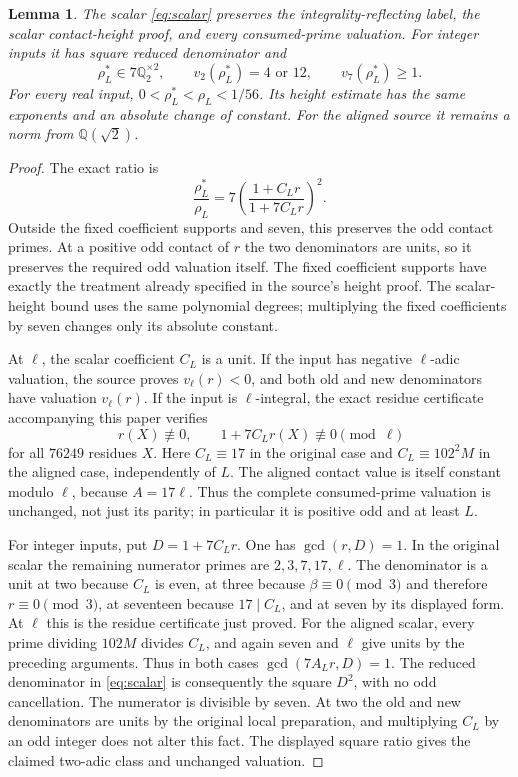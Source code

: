 \documentclass[11pt,a4paper]{article}
\newtheorem{lemma}[theorem]{Lemma}
\newcommand{\Q}{\mathbb Q}\newcommand{\Z}{\mathbb Z}
\begin{document}
\begin{lemma}\label{lem:scalar}
The scalar \eqref{eq:scalar} preserves the integrality-reflecting
label, the scalar contact-height proof, and every consumed-prime
valuation. For integer inputs it has square reduced denominator and
\[
 \rho_L^*\in7\Q_2^{\times2},\qquad
 v_2(\rho_L^*)=4\text{ or }12,\qquad v_7(\rho_L^*)\ge1.
\]
For every real input, \(0<\rho_L^*<\rho_L<1/56\).
Its height estimate has the same exponents and an absolute change
of constant. For the aligned source it remains a norm from \(\Q(\sqrt2)\).
\end{lemma}
\begin{proof}
The exact ratio is
\[
 \frac{\rho_L^*}{\rho_L}
       =7\left(\frac{1+C_Lr}{1+7C_Lr}\right)^2.
\]
Outside the fixed coefficient supports and seven, this preserves the
odd contact primes. At a positive odd contact of \(r\) the two
denominators are units, so it preserves the required odd valuation
itself. The fixed coefficient supports have exactly the treatment
already specified in the source's height proof. The scalar-height
bound uses the same polynomial degrees; multiplying the fixed
coefficients by seven changes only its absolute constant.

At \(\ell\), the scalar coefficient \(C_L\) is a unit. If the
input has negative \(\ell\)-adic valuation, the source proves
\(v_\ell(r)<0\), and both old and new denominators have valuation
\(v_\ell(r)\). If the input is \(\ell\)-integral, the exact
residue certificate accompanying this paper verifies
\[
            r(X)\not\equiv0,\qquad 1+7C_Lr(X)\not\equiv0\pmod\ell
\]
for all \(76249\) residues \(X\). Here \(C_L\equiv17\) in the
original case and \(C_L\equiv102^2M\) in the aligned case,
independently of \(L\). The aligned contact value is itself
constant modulo \(\ell\), because \(A=17\ell\).
Thus the complete consumed-prime valuation is unchanged, not just
its parity; in particular it is positive odd and at least \(L\).

For integer inputs, put \(D=1+7C_Lr\). One has \(\gcd(r,D)=1\).
In the original scalar the remaining numerator primes are
\(2,3,7,17,\ell\). The denominator is a unit at two because
\(C_L\) is even, at three because \(\beta\equiv0\pmod3\) and
therefore \(r\equiv0\pmod3\), at seventeen because \(17\mid C_L\),
and at seven by its displayed form. At \(\ell\) this is the
residue certificate just proved. For the aligned scalar, every
prime dividing \(102M\) divides \(C_L\), and again seven and
\(\ell\) give units by the preceding arguments. Thus in both cases
\(\gcd(7A_Lr,D)=1\). The reduced denominator in
\eqref{eq:scalar} is consequently the square \(D^2\), with no
odd cancellation. The numerator is divisible by seven.
At two the old and new denominators are units by the original
local preparation, and multiplying \(C_L\) by an odd integer does
not alter this fact. The displayed square ratio gives the claimed
two-adic class and unchanged valuation.


\end{proof}
\end{document}
